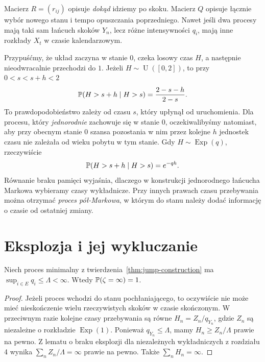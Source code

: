 \begin{uwaga}
Macierz $R=(r_{ij})$ opisuje \emph{dokąd} idziemy po skoku.
Macierz $Q$ opisuje łącznie wybór nowego stanu i tempo
opuszczania poprzedniego. Nawet jeśli dwa procesy mają taki sam
łańcuch skoków $Y_n$, lecz różne intensywności $q_i$,
mają inne rozkłady $X_t$ w czasie kalendarzowym.
\end{uwaga}


\begin{przyklad}
Przypuśćmy, że układ zaczyna w stanie $0$, czeka losowy
czas $H$, a następnie nieodwracalnie przechodzi do $1$.
Jeżeli $H\sim\operatorname{U}([0,2])$, to przy $0<s<s+h<2$
\[
\mathbb{P}(H>s+h\mid H>s)=\frac{2-s-h}{2-s}.
\]
To prawdopodobieństwo zależy od czasu $s$, który upłynął
od uruchomienia. Dla procesu, który \emph{jednorodnie}
zachowuje się w stanie $0$, oczekiwalibyśmy natomiast,
aby przy obecnym stanie $0$ szansa pozostania w nim przez
kolejne $h$ jednostek czasu nie zależała od wieku pobytu
w tym stanie. Gdy $H\sim\operatorname{Exp}(q)$, rzeczywiście
\[
\mathbb{P}(H>s+h\mid H>s)=e^{-qh}.
\]
Równanie braku pamięci wyjaśnia, dlaczego w konstrukcji
jednorodnego łańcucha Markowa wybieramy czasy wykładnicze.
Przy innych prawach czasu przebywania można otrzymać
\emph{proces pół-Markowa}, w którym do stanu należy
dodać informację o czasie od ostatniej zmiany.
\end{przyklad}

\section{Eksplozja i jej wykluczanie}
\begin{twierdzenie}
\label{thm:bounded-rates}
Niech proces minimalny z twierdzenia~\ref{thm:jump-construction}
ma $\sup_{i\in E}q_i\le\Lambda<\infty$.
Wtedy $\mathbb{P}(\zeta=\infty)=1$.
\end{twierdzenie}
\begin{proof}
Jeżeli proces wchodzi do stanu pochłaniającego, to oczywiście
nie może mieć nieskończenie wielu rzeczywistych skoków
w czasie skończonym. W przeciwnym razie kolejne czasy
przebywania są równe $H_n=Z_n/q_{Y_n}$, gdzie
$Z_n$ są niezależne o rozkładzie $\operatorname{Exp}(1)$.
Ponieważ $q_{Y_n}\le\Lambda$, mamy
$H_n\ge Z_n/\Lambda$ prawie na pewno.
Z lematu o braku eksplozji dla niezależnych wykładniczych
z rozdziału 4 wynika $\sum_n Z_n/\Lambda=\infty$
prawie na pewno. Także $\sum_n H_n=\infty$.
\end{proof}

